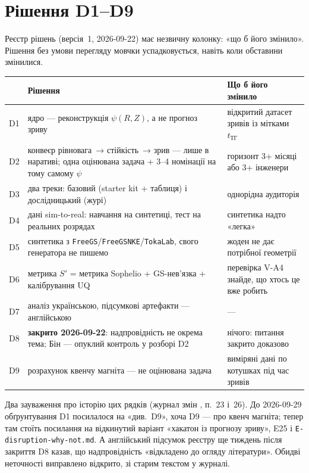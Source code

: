 \section{Рішення D1--D9}\label{sec:g01-decisions}

Реєстр рішень \cite{RegDec} (версія~1, 2026-09-22) має незвичну колонку: «що б його
змінило». Рішення без умови перегляду мовчки успадковується, навіть коли обставини
змінилися.

\begin{center}\small
\begin{tabularx}{\textwidth}{@{}p{0.7cm}Xp{4.3cm}@{}}
\toprule
& Рішення & Що б його змінило \\
\midrule
D1 & ядро --- реконструкція $\psi(R,Z)$, а не прогноз зриву & відкритий датасет зривів із
  мітками $t_{\text{ТГ}}$ \\
D2 & конвеєр рівновага~→ стійкість~→ зрив --- лише в наративі; одна оцінювана задача +
  3--4 номінації на тому самому $\psi$ & горизонт 3+ місяці або 3+ інженери \\
D3 & два треки: базовий (starter kit + таблиця) і дослідницький (журі) & однорідна
  аудиторія \\
D4 & дані sim-to-real: навчання на синтетиці, тест на реальних розрядах & синтетика надто
  «легка» \\
D5 & синтетика з \texttt{FreeGS}/\texttt{FreeGSNKE}/\texttt{TokaLab}, свого генератора не
  пишемо & жоден не дає потрібної геометрії \\
D6 & метрика $S'$ = метрика Sophelio + GS-нев'язка + калібрування UQ & перевірка V-A4
  знайде, що хтось це вже робить \\
D7 & аналіз українською, підсумкові артефакти --- англійською & --- \\
D8 & \textbf{закрито 2026-09-22}: надпровідність не окрема тема; Бін --- опуклий контроль
  у розборі D2 & нічого: питання закрито доказово \\
D9 & розрахунок квенчу магніта --- не оцінювана задача & виміряні дані по котушках під час
  зривів \\
\bottomrule
\end{tabularx}
\end{center}

Два зауваження про історію цих рядків (журнал змін \cite{RegLog}, п.~23 і~26). До
2026-09-29 обґрунтування D1 посилалося на «див.~D9», хоча D9 --- про квенч магніта; тепер
там стоїть посилання на відкинутий варіант «хакатон із прогнозу зриву», E25 і
\texttt{E-disruption-why-not.md}. А англійський підсумок реєстру ще тиждень після
закриття D8 казав, що надпровідність «відкладено до огляду літератури». Обидві неточності
виправлено відкрито, зі старим текстом у журналі.

